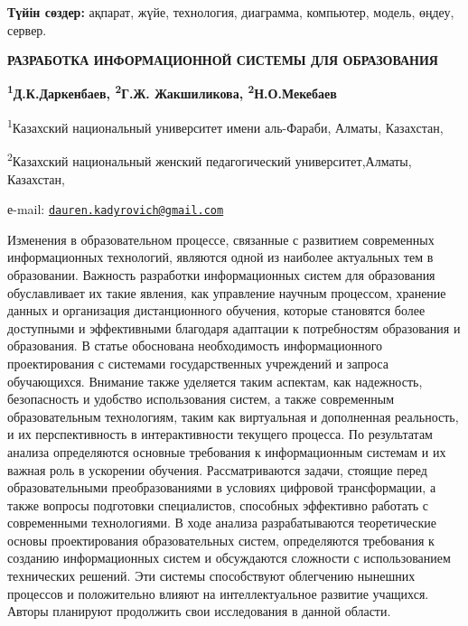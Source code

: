 {\bfseries Түйін сөздер:} ақпарат, жүйе, технология, диаграмма, компьютер,
модель, өңдеу, сервер.

\begin{articleheader}
{\bfseries РАЗРАБОТКА ИНФОРМАЦИОННОЙ СИСТЕМЫ ДЛЯ ОБРАЗОВАНИЯ}

{\bfseries \textsuperscript{1}Д.К.Даркенбаев\textsuperscript{\envelope },
\textsuperscript{2}Г.Ж. Жакшиликова, \textsuperscript{2}Н.О.Мекебаев}
\end{articleheader}

\begin{affiliation}
\textsuperscript{1}Казахский национальный университет имени аль-Фараби,
Алматы, Казахстан,

\textsuperscript{2}Казахский национальный женский педагогический
университет,Алматы, Казахстан,

е-mail:
\href{mailto:dauren.kadyrovich@gmail.com}{\nolinkurl{dauren.kadyrovich@gmail.com}}
\end{affiliation}

Изменения в образовательном процессе, связанные с развитием современных
информационных технологий, являются одной из наиболее актуальных тем в
образовании. Важность разработки информационных систем для образования
обуславливает их такие явления, как управление научным процессом,
хранение данных и организация дистанционного обучения, которые
становятся более доступными и эффективными благодаря адаптации к
потребностям образования и образования. В статье обоснована
необходимость информационного проектирования с системами государственных
учреждений и запроса обучающихся. Внимание также уделяется таким
аспектам, как надежность, безопасность и удобство использования систем,
а также современным образовательным технологиям, таким как виртуальная и
дополненная реальность, и их перспективность в интерактивности текущего
процесса. По результатам анализа определяются основные требования к
информационным системам и их важная роль в ускорении обучения.
Рассматриваются задачи, стоящие перед образовательными преобразованиями
в условиях цифровой трансформации, а также вопросы подготовки
специалистов, способных эффективно работать с современными технологиями.
В ходе анализа разрабатываются теоретические основы проектирования
образовательных систем, определяются требования к созданию
информационных систем и обсуждаются сложности с использованием
технических решений. Эти системы способствуют облегчению нынешних
процессов и положительно влияют на интеллектуальное развитие учащихся.
Авторы планируют продолжить свои исследования в данной области.

